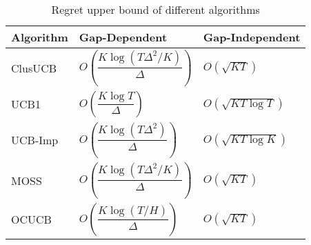 \begin{table}[!h]
\caption{Regret upper bound of different algorithms}
\label{tab:comp-bds}
\begin{center}
\begin{tabular}{p{6em}p{12em}p{10em}}
\toprule
Algorithm  & Gap-Dependent & Gap-Independent \\
\hline
ClusUCB		& $O\left( \dfrac{K\log (T\Delta^2 /K)}{\Delta}\right)$ & $O\left(\sqrt{KT}\right)$\\
UCB1        & $O\left( \dfrac{K\log T}{\Delta} \right)$ & $O\left(\sqrt{KT\log T}\right)$ \\%
UCB-Imp 		& $O\left( \dfrac{K\log (T\Delta^2)}{\Delta} \right)$ & $O\left(\sqrt{KT\log K}\right)$ \\%
MOSS	     	& $O\left( \dfrac{K\log (T\Delta^2 /K)}{\Delta}\right)$ & $O\left(\sqrt{KT}\right)$\\%
OCUCB     	& $O\left( \dfrac{K\log (T/ H)}{\Delta}\right)$ & $O\left(\sqrt{KT}\right)$\\\midrule
\end{tabular}
\end{center}
\vspace*{-2em}
\end{table}




